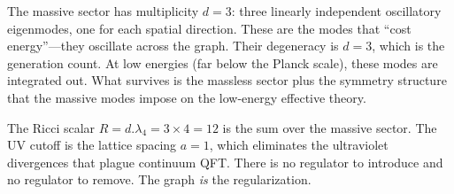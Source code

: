 \documentclass[11pt,a4paper]{book}
\def\cdot{.}%
\begin{document}
The massive sector has multiplicity $d = 3$: three linearly independent oscillatory eigenmodes, one for each spatial direction. These are the modes that ``cost energy''---they oscillate across the graph. Their degeneracy is $d = 3$, which is the generation count. At low energies (far below the Planck scale), these modes are integrated out. What survives is the massless sector plus the symmetry structure that the massive modes impose on the low-energy effective theory.

The Ricci scalar $R = d \cdot \lambda_4 = 3 \times 4 = 12$ is the sum over the massive sector. The UV cutoff is the lattice spacing $a = 1$, which eliminates the ultraviolet divergences that plague continuum QFT. There is no regulator to introduce and no regulator to remove. The graph \emph{is} the regularization.
\end{document}
